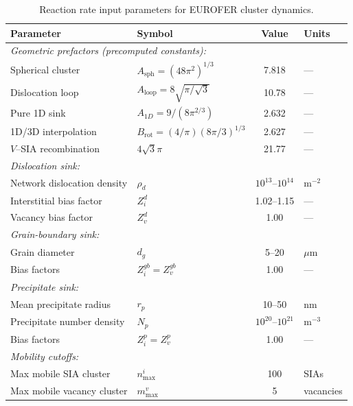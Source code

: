 \begin{table}[htbp]
\centering
\caption{Reaction rate input parameters for EUROFER cluster dynamics.}
\label{tab:rate_params}
\renewcommand{\arraystretch}{1.15}
\begin{tabular}{@{}llcl@{}}
\toprule
\textbf{Parameter} & \textbf{Symbol} & \textbf{Value} & \textbf{Units} \\
\midrule
\multicolumn{4}{l}{\emph{Geometric prefactors (precomputed constants):}} \\
Spherical cluster & $A_{\mathrm{sph}} = (48\pi^2)^{1/3}$ & 7.818 & --- \\
Dislocation loop & $A_{\mathrm{loop}} = 8\sqrt{\pi/\sqrt{3}}$ & 10.78 & --- \\
Pure 1D sink & $A_{1D} = 9/(8\pi^{2/3})$ & 2.632 & --- \\
1D/3D interpolation & $B_{\mathrm{rot}} = (4/\pi)(8\pi/3)^{1/3}$ & 2.627 & --- \\
$V$--SIA recombination & $4\sqrt{3}\pi$ & 21.77 & --- \\[4pt]

\multicolumn{4}{l}{\emph{Dislocation sink:}} \\
Network dislocation density & $\rho_d$ & $10^{13}$--$10^{14}$ & m$^{-2}$ \\
Interstitial bias factor & $Z_i^d$ & 1.02--1.15 & --- \\
Vacancy bias factor & $Z_v^d$ & 1.00 & --- \\[4pt]

\multicolumn{4}{l}{\emph{Grain-boundary sink:}} \\
Grain diameter & $d_g$ & 5--20 & $\mu$m \\
Bias factors & $Z_i^{gb} = Z_v^{gb}$ & 1.00 & --- \\[4pt]

\multicolumn{4}{l}{\emph{Precipitate sink:}} \\
Mean precipitate radius & $r_p$ & 10--50 & nm \\
Precipitate number density & $N_p$ & $10^{20}$--$10^{21}$ & m$^{-3}$ \\
Bias factors & $Z_i^p = Z_v^p$ & 1.00 & --- \\[4pt]

\multicolumn{4}{l}{\emph{Mobility cutoffs:}} \\
Max mobile SIA cluster & $n_{\max}^i$ & 100 & SIAs \\
Max mobile vacancy cluster & $m_{\max}^v$ & 5 & vacancies \\[4pt]


\end{tabular}
\end{table}
